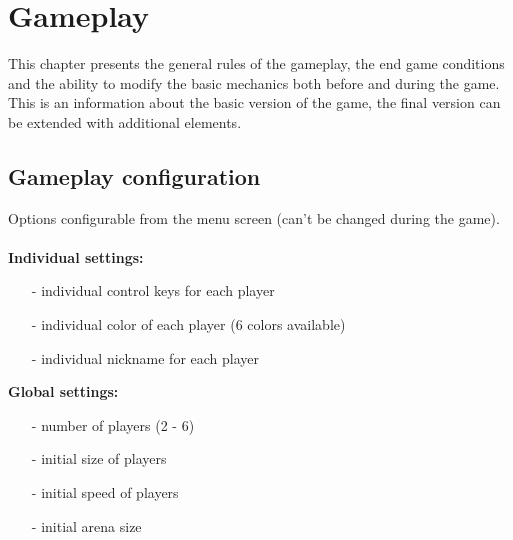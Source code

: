 \section{Gameplay}
\noindent This chapter presents the general rules of the gameplay, the end game conditions and the ability to modify the basic mechanics both before and during the game. This is an information about the basic version of the game, the final version can be extended with additional elements.

\subsection{Gameplay configuration}
\noindent Options configurable from the menu screen (can't be changed during the game).
\\
\\
\noindent \textbf{Individual settings:}
\begin{itemize}
	\item[-] individual control keys for each player
	\item[-] individual color of each player (6 colors available)
	\item[-] individual nickname for each player
\end{itemize}

\noindent \textbf{Global settings:}
\begin{itemize}
	\item[-] number of players (2 - 6)
	\item[-] initial size of players
	\item[-] initial speed of players
	\item[-] initial arena size
\end{itemize}

